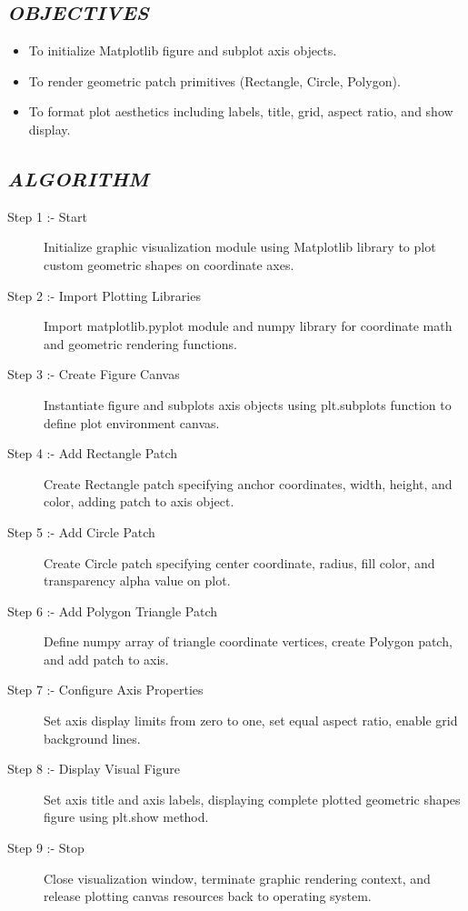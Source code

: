\documentclass[11pt,a4paper]{article}
\begin{document}
\subsection*{\textit{OBJECTIVES}}
\begin{itemize}
  \item To initialize Matplotlib figure and subplot axis objects.
  \item To render geometric patch primitives (Rectangle, Circle, Polygon).
  \item To format plot aesthetics including labels, title, grid, aspect ratio, and show display.
\end{itemize}

\subsection*{\textit{ALGORITHM}}
\begin{description}
  \item[Step 1 :- Start] Initialize graphic visualization module using Matplotlib library to plot custom geometric shapes on coordinate axes.
  \item[Step 2 :- Import Plotting Libraries] Import matplotlib.pyplot module and numpy library for coordinate math and geometric rendering functions.
  \item[Step 3 :- Create Figure Canvas] Instantiate figure and subplots axis objects using plt.subplots function to define plot environment canvas.
  \item[Step 4 :- Add Rectangle Patch] Create Rectangle patch specifying anchor coordinates, width, height, and color, adding patch to axis object.
  \item[Step 5 :- Add Circle Patch] Create Circle patch specifying center coordinate, radius, fill color, and transparency alpha value on plot.
  \item[Step 6 :- Add Polygon Triangle Patch] Define numpy array of triangle coordinate vertices, create Polygon patch, and add patch to axis.
  \item[Step 7 :- Configure Axis Properties] Set axis display limits from zero to one, set equal aspect ratio, enable grid background lines.
  \item[Step 8 :- Display Visual Figure] Set axis title and axis labels, displaying complete plotted geometric shapes figure using plt.show method.
  \item[Step 9 :- Stop] Close visualization window, terminate graphic rendering context, and release plotting canvas resources back to operating system.
\end{description}
\end{document}
